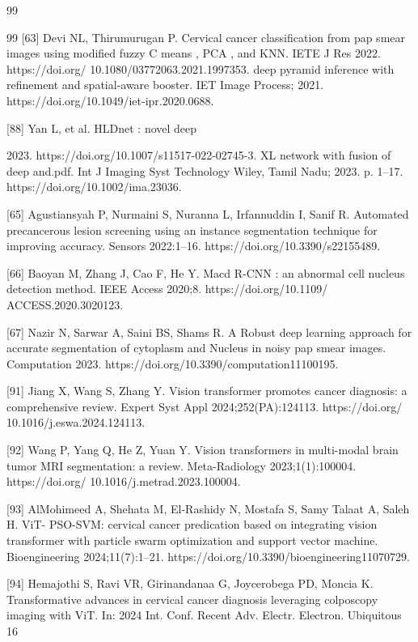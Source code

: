 \documentclass{svjour3}
\begin{document}
\begin{thebibliography}{99}
\begin{thebibliography}{99}
 [63] Devi NL, Thirumurugan P. Cervical cancer classification from pap smear images using modified fuzzy C means , PCA , and KNN. IETE J Res 2022. https://doi.org/ 10.1080/03772063.2021.1997353. deep pyramid inference with refinement and spatial-aware booster. IET Image Process; 2021. https://doi.org/10.1049/iet-ipr.2020.0688.

 [88] Yan L, et al. HLDnet : novel deep

 2023. https://doi.org/10.1007/s11517-022-02745-3. XL network with fusion of deep and.pdf. Int J Imaging Syst Technology Wiley, Tamil Nadu; 2023. p. 1–17. https://doi.org/10.1002/ima.23036.

 [65] Agustiansyah P, Nurmaini S, Nuranna L, Irfannuddin I, Sanif R. Automated precancerous lesion screening using an instance segmentation technique for improving accuracy. Sensors 2022:1–16. https://doi.org/10.3390/s22155489.

 [66] Baoyan M, Zhang J, Cao F, He Y. Macd R-CNN : an abnormal cell nucleus detection method. IEEE Access 2020;8. https://doi.org/10.1109/ ACCESS.2020.3020123.

 [67] Nazir N, Sarwar A, Saini BS, Shams R. A Robust deep learning approach for accurate segmentation of cytoplasm and Nucleus in noisy pap smear images. Computation 2023. https://doi.org/10.3390/computation11100195.

 [91] Jiang X, Wang S, Zhang Y. Vision transformer promotes cancer diagnosis: a comprehensive review. Expert Syst Appl 2024;252(PA):124113. https://doi.org/ 10.1016/j.eswa.2024.124113.

 [92] Wang P, Yang Q, He Z, Yuan Y. Vision transformers in multi-modal brain tumor MRI segmentation: a review. Meta-Radiology 2023;1(1):100004. https://doi.org/ 10.1016/j.metrad.2023.100004.

 [93] AlMohimeed A, Shehata M, El-Rashidy N, Mostafa S, Samy Talaat A, Saleh H. ViT- PSO-SVM: cervical cancer predication based on integrating vision transformer with particle swarm optimization and support vector machine. Bioengineering 2024;11(7):1–21. https://doi.org/10.3390/bioengineering11070729.

 [94] Hemajothi S, Ravi VR, Girinandanaa G, Joycerobega PD, Moncia K. Transformative advances in cervical cancer diagnosis leveraging colposcopy imaging with ViT. In: 2024 Int. Conf. Recent Adv. Electr. Electron. Ubiquitous 16


\end{thebibliography}
\end{thebibliography}
\end{document}
